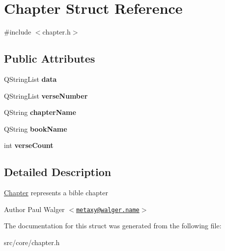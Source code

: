 \hypertarget{structChapter}{
\section{Chapter Struct Reference}
\label{structChapter}
}


{\ttfamily \#include $<$chapter.h$>$}\subsection*{Public Attributes}
\begin{DoxyCompactItemize}
\item 
\hypertarget{structChapter_a321e378b12d5fed1ba2fae4affdb78c7}{
QStringList {\bfseries data}}
\label{structChapter_a321e378b12d5fed1ba2fae4affdb78c7}

\item 
\hypertarget{structChapter_a29c571d490cce0129070cefe1fe0da61}{
QStringList {\bfseries verseNumber}}
\label{structChapter_a29c571d490cce0129070cefe1fe0da61}

\item 
\hypertarget{structChapter_a33e98674c40021c573e2395cc53f5dc2}{
QString {\bfseries chapterName}}
\label{structChapter_a33e98674c40021c573e2395cc53f5dc2}

\item 
\hypertarget{structChapter_a7fcbb066f25d59fb5877582ab7dad46c}{
QString {\bfseries bookName}}
\label{structChapter_a7fcbb066f25d59fb5877582ab7dad46c}

\item 
\hypertarget{structChapter_af1670eaa97d549f1d95686507665a1aa}{
int {\bfseries verseCount}}
\label{structChapter_af1670eaa97d549f1d95686507665a1aa}

\end{DoxyCompactItemize}


\subsection{Detailed Description}
\hyperlink{structChapter}{Chapter} represents a bible chapter

\begin{DoxyAuthor}{Author}
Paul Walger $<$\href{mailto:metaxy@walger.name}{\tt metaxy@walger.name}$>$ 
\end{DoxyAuthor}


The documentation for this struct was generated from the following file:\begin{DoxyCompactItemize}
\item 
src/core/chapter.h\end{DoxyCompactItemize}
